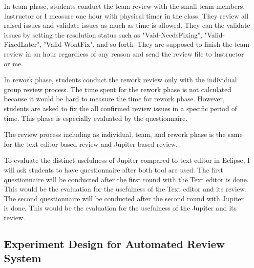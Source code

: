 In team phase, students conduct the team review with the small team
members. Instructor or I measure one hour with physical timer in the
class. They review all raised issues and validate issues as much as
time is allowed. They can the validate issues by setting the
resolution status such as "Vaid-NeedsFixing", "Valid-FixedLater",
"Valid-WontFix", and so forth. They are supposed to finish the team
review in an hour regardless of any reason and send the review file
to Instructor or me.

In rework phase, students conduct the rework review only with the
individual group review process. The time spent for the rework phase
is not calculated because it would be hard to measure the time for
rework phase. However, students are asked to fix the all confirmed
review issues in a specific period of time. This phase is especially
evaluated by the questionnaire.

The review process including as individual, team, and rework phase
is the same for the text editor based review and Jupiter based
review.

To evaluate the distinct usefulness of Jupiter compared to text
editor in Eclipse, I will ask students to have questionnaire after
both tool are used. The first questionnaire will be conducted after
the first round with the Text editor is done. This would be the
evaluation for the usefulness of the Text editor and its review. The
second questionnaire will be conducted after the second round with
Jupiter is done. This would be the evaluation for the usefulness of
the Jupiter and its review.


\subsection{Experiment Design for Automated Review System}
